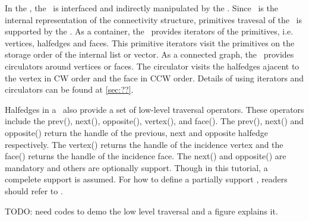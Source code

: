 In the \poly, the \hds\ is interfaced and indirectly manipulated
by the \poly. Since \hds\ is the internal representation of the
connectivity structure, primitives travesal of the \poly\ is
supported by the \hds . As a container, the \hds\ provides 
iterators of the primitives, i.e. vertices, halfedges and faces.
This primitive iterators visit the primitives on the storage
order of the internal list or vector. As a connected graph,
the \hds\ provides circulators around vertices or faces.
The circulator visits the halfedges ajacent to the vertex
in CW order and the face in CCW order. Details of using iterators
and circulators can be found at \ref{sec:??}.

Halfedges in a \hds\ also provide a set of low-level 
traversal operators. These operators include the prev(), next(), 
opposite(), vertex(), and face(). The prev(), next() and opposite()
return the handle of the previous, next and opposite
halfedge respectively. The vertex() returns the handle of the 
incidence vertex and the face() returns the handle of the 
incidence face. The next() and opposite() are mandatory and others
are optionally support. Though in this tutorial, a compelete
support is assumed. For how to define a partially support \hds ,
readers should refer to \cite{cgalmanul}.   

TODO: need codes to demo the low level traversal and a figure
explains it. 
